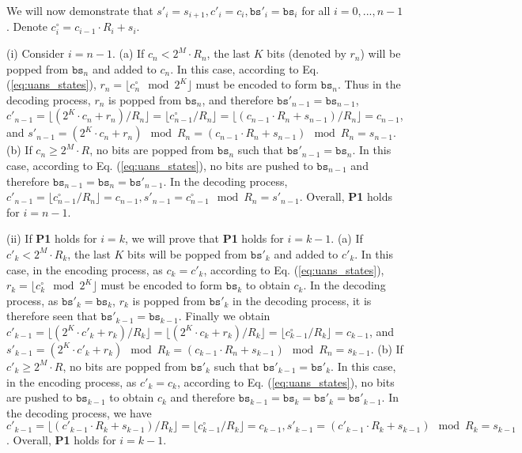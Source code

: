 \documentclass{article}
\begin{document}
We will now demonstrate that $s'_i = s_{i+1}, c'_i = c_i, \texttt{bs}'_i = \texttt{bs}_i$ for all $i=0, ..., n-1$. Denote $c_i^\circ = c_{i-1} \cdot R_{i} + s_{i}$. 

(i) Consider $i=n-1$. (a) If $c_n < 2^M \cdot R_n$, the last $K$ bits (denoted by $r_n$) will be popped from $\texttt{bs}_n$ and added to $c_n$. In this case, according to Eq. (\ref{eq:uans_states}), $r_n = \lfloor c_n^\circ \mod 2^K \rfloor$ must be encoded to form $\texttt{bs}_n$. Thus in the decoding process, $r_n$ is popped from $\texttt{bs}_n$, and therefore $\texttt{bs}'_{n-1} = \texttt{bs}_{n-1}$, $c'_{n-1} = \lfloor (2^K \cdot c_n + r_n ) / R_n \rfloor = \lfloor c_{n-1}^\circ / R_n \rfloor = \lfloor (c_{n-1} \cdot R_n + s_{n-1}) / R_n \rfloor = c_{n-1}$, and $s'_{n-1} = (2^K \cdot c_n + r_n ) \mod R_n = (c_{n-1} \cdot R_n + s_{n-1}) \mod R_n = s_{n-1}$. (b) If $c_n \ge 2^M \cdot R$, no bits are popped from $\texttt{bs}_{n}$ such that $\texttt{bs}'_{n-1} = \texttt{bs}_n$. In this case, according to Eq. (\ref{eq:uans_states}), no bits are pushed to $\texttt{bs}_{n-1}$ and therefore $\texttt{bs}_{n-1} = \texttt{bs}_n = \texttt{bs}'_{n-1}$. In the decoding process, $c'_{n-1} = \lfloor c_{n-1}^\circ / R_n \rfloor = c_{n-1}, s'_{n-1} = c_{n-1}^\circ \mod R_n = s'_{n-1}$. Overall, {\bf P1} holds for $i=n-1$.

(ii) If {\bf P1} holds for $i=k$, we will prove that {\bf P1} holds for $i=k-1$. (a) If $c'_k < 2^M \cdot R_k$, the last $K$ bits will be popped from $\texttt{bs}'_k$ and added to $c'_k$. In this case, in the encoding process, as $c_k = c'_k$, according to Eq. (\ref{eq:uans_states}), $r_k = \lfloor c_k^\circ \mod 2^K \rfloor$ must be encoded to form $\texttt{bs}_k$ to obtain $c_k$. In the decoding process, as $\texttt{bs}'_k = \texttt{bs}_k$, $r_k$ is popped from $\texttt{bs}'_k$ in the decoding process, it is therefore seen that $\texttt{bs}'_{k-1} = \texttt{bs}_{k-1}$. Finally we obtain $c'_{k-1} = \lfloor (2^K \cdot c'_k + r_k ) / R_k \rfloor = \lfloor (2^K \cdot c_k + r_k ) / R_k \rfloor = \lfloor c_{k-1}^\circ / R_k \rfloor = c_{k-1}$, and $s'_{k-1} = (2^K \cdot c'_k + r_k ) \mod R_k = (c_{k-1} \cdot R_n + s_{k-1}) \mod R_n = s_{k-1}$. (b) If $c'_k \ge 2^M \cdot R$, no bits are popped from $\texttt{bs}'_{k}$ such that $\texttt{bs}'_{k-1} = \texttt{bs}'_k$. In this case, in the encoding process, as $c'_k = c_k$, according to Eq. (\ref{eq:uans_states}), no bits are pushed to $\texttt{bs}_{k-1}$ to obtain $c_k$ and therefore $\texttt{bs}_{k-1} = \texttt{bs}_k = \texttt{bs}'_k = \texttt{bs}'_{k-1}$. In the decoding process, we have $c'_{k-1} = \lfloor (c'_{k-1} \cdot R_k + s_{k-1}) / R_k \rfloor = \lfloor c_{k-1}^\circ / R_k \rfloor = c_{k-1}, s'_{k-1} = (c'_{k-1} \cdot R_k + s_{k-1}) \mod R_k = s_{k-1}$. Overall, {\bf P1} holds for $i=k-1$.
\end{document}
